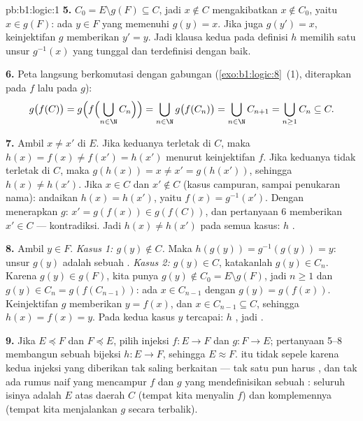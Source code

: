 \begin{solution}{pb:b1:logic:1}
\textbf{5.} $C_0 = E \setminus g(F) \subseteq C$, jadi $x \notin C$
mengakibatkan $x \notin C_0$, yaitu $x \in g(F)$: ada $y \in F$ yang memenuhi
$g(y) = x$. Jika juga $g(y') = x$, keinjektifan $g$ memberikan $y' = y$.
Jadi klausa kedua pada definisi $h$ memilih satu unsur $g^{-1}(x)$ yang
tunggal dan terdefinisi dengan baik.

\textbf{6.} Peta langsung berkomutasi dengan gabungan
(\cref{exo:b1:logic:8}~(1), diterapkan pada $f$ lalu pada $g$):
\[
g\bigl(f(C)\bigr)
= g\Bigl(f\Bigl(\bigcup_{n \in \N} C_n\Bigr)\Bigr)
= \bigcup_{n \in \N} g\bigl(f(C_n)\bigr)
= \bigcup_{n \in \N} C_{n+1}
= \bigcup_{n \geq 1} C_n \subseteq C .
\]

\textbf{7.} Ambil $x \neq x'$ di $E$. Jika keduanya terletak di $C$, maka $h(x) =
f(x) \neq f(x') = h(x')$ menurut keinjektifan $f$. Jika keduanya tidak terletak di
$C$, maka $g(h(x)) = x \neq x' = g(h(x'))$, sehingga $h(x) \neq h(x')$. Jika
$x \in C$ dan $x' \notin C$ (kasus campuran, sampai penukaran nama):
andaikan $h(x) = h(x')$, yaitu $f(x) = g^{-1}(x')$. Dengan menerapkan $g$:
$x' = g(f(x)) \in g(f(C))$, dan pertanyaan 6 memberikan $x' \in C$ ---
kontradiksi. Jadi $h(x) \neq h(x')$ pada semua kasus: $h$ .

\textbf{8.} Ambil $y \in F$. \emph{Kasus 1: $g(y) \notin C$.} Maka
$h(g(y)) = g^{-1}(g(y)) = y$: unsur $g(y)$ adalah sebuah .
\emph{Kasus 2: $g(y) \in C$}, katakanlah $g(y) \in C_n$. Karena $g(y) \in
g(F)$, kita punya $g(y) \notin C_0 = E \setminus g(F)$, jadi $n \geq 1$
dan $g(y) \in C_n = g(f(C_{n-1}))$: ada $x \in C_{n-1}$ dengan
$g(y) = g(f(x))$. Keinjektifan $g$ memberikan $y = f(x)$, dan $x \in
C_{n-1} \subseteq C$, sehingga $h(x) = f(x) = y$. Pada kedua kasus $y$
tercapai: $h$ , jadi .

\textbf{9.} Jika $E \preceq F$ dan $F \preceq E$, pilih injeksi $f
\colon E \to F$ dan $g \colon F \to E$; pertanyaan 5--8 membangun sebuah
bijeksi $h \colon E \to F$, sehingga $E \approx F$.  itu
tidak sepele karena kedua injeksi yang diberikan tak saling berkaitan --- tak satu pun
harus , dan tak ada rumus naif yang mencampur $f$ dan $g$ yang mendefinisikan
sebuah : seluruh isinya adalah  $E$ atas daerah $C$
(tempat kita menyalin $f$) dan komplemennya (tempat kita menjalankan $g$
secara terbalik).


\end{solution}
